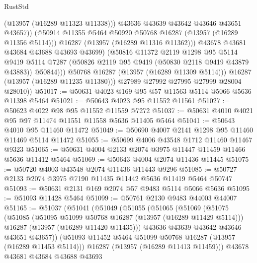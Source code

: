 \begin{lexlean}{RustStd}
\begin{coremodule}
                          (@13957 (@16289 @11323 @11338)))
                        @43636
                        @43639
                        @43642
                        @43646
                        @43651
                        @43657))
                    (@50914 @11355 @5464 @50920 @50768 @16287 (@13957 (@16289 @11356 @5114)))
                    @16287
                    (@13957 (@16289 @11316 @11362)))
                  @43678
                  @43681
                  @43684
                  @43688
                  @43693
                  @43699)
                (@50816
                  @11372
                  @2119
                  @1298
                  @95
                  @5114
                  @9419
                  @5114
                  @7287
                  (@50826 @2119 @95 @9419 (@50830 @2118 @9419 @43879 @43883))
                  @50844)))
            @50768
            @16287
            (@13957 (@16289 @11309 @5114)))
          @16287
          (@13957 (@16289 @11235 @11380)))
        @27989
        @27992
        @27995
        @27999
        @28004
        @28010))
@51017 := @50631 @4023 @169 @95 @57 @11563 @5114 @5066 @5636 @11398 @5464
@51021 := @50643 @4023 @95 @11552 @11561
@51027 := @50623 @4022 @98 @95 @11552 @11559 @7272
@51037 := @50631 @4010 @4021 @95 @97 @11474 @11551 @11558 @5636 @11405 @5464
@51041 := @50643 @4010 @95 @11460 @11472
@51049 := @50690 @4007 @2141 @1298 @95 @11460 @11469 @5114 @11472
@51055 := @50699 @4006 @43548 @1712 @11460 @11467 @9323
@51065 := @50631 @4004 @2133 @2074 @3975 @11447 @11459 @11466 @5636 @11412 @5464
@51069 := @50643 @4004 @2074 @11436 @11445
@51075 := @50720 @4003 @43548 @2074 @11436 @11443 @9296
@51085 := @50727 @2133 @2074 @3975 @7190 @11435 @11442 @5636 @11419 @5464 @50747
@51093 := @50631 @2131 @169 @2074 @57 @9483 @5114 @5066 @5636
@51095 := @51093 @11428 @5464
@51099 := @50761 @2130 @9483 @44003 @44007
@51165 := @51037
    (@51041
      (@51049
        (@51055
          (@51065
            (@51069
              (@51075
                (@51085
                  (@51095 @51099 @50768 @16287 (@13957 (@16289 @11429 @5114)))
                  @16287
                  (@13957 (@16289 @11420 @11435)))
                @43636
                @43639
                @43642
                @43646
                @43651
                @43657))
            (@51093 @11452 @5464 @51099 @50768 @16287 (@13957 (@16289 @11453 @5114)))
            @16287
            (@13957 (@16289 @11413 @11459)))
          @43678
          @43681
          @43684
          @43688
          @43693

\end{coremodule}
\end{lexlean}
